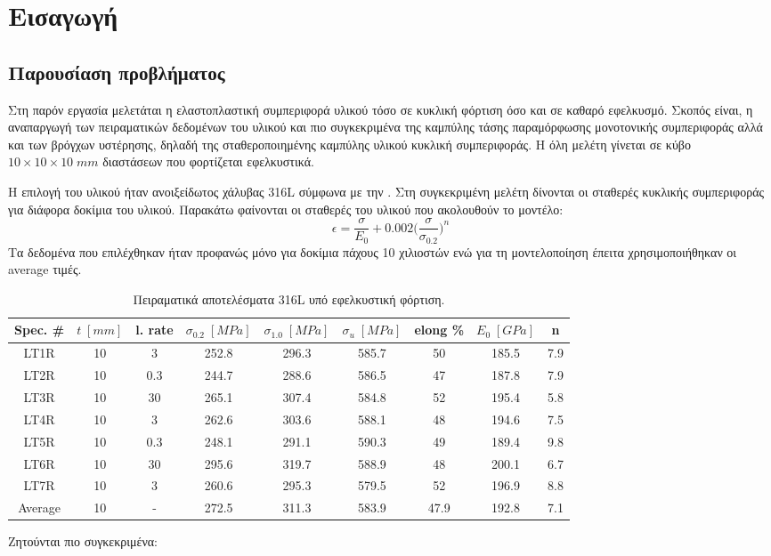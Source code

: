 \documentclass{article}
\begin{document}

\tableofcontents

\section{Εισαγωγή}
\subsection{Παρουσίαση προβλήματος}

Στη παρόν εργασία μελετάται η ελαστοπλαστική συμπεριφορά υλικού τόσο σε κυκλική φόρτιση όσο και σε καθαρό εφελκυσμό. Σκοπός είναι, η αναπαργωγή των πειραματικών δεδομένων του υλικού και πιο συγκεκριμένα της καμπύλης τάσης παραμόρφωσης μονοτονικής συμπεριφοράς αλλά και των βρόγχων υστέρησης, δηλαδή της σταθεροποιημένης καμπύλης υλικού κυκλική συμπεριφοράς. Η όλη μελέτη γίνεται σε κύβο $10\times 10\times 10\; mm$ διαστάσεων που φορτίζεται εφελκυστικά. 
\par Η επιλογή του υλικού ήταν ανοιξείδωτος χάλυβας 316L σύμφωνα με την \cite{RASMUSSEN200347}. Στη συγκεκριμένη μελέτη δίνονται οι σταθερές κυκλικής συμπεριφοράς για διάφορα δοκίμια του υλικού. Παρακάτω φαίνονται οι σταθερές του υλικού που ακολουθούν το μοντέλο:
\begin{equation}
    \epsilon = \frac{\sigma}{E_0} + 0.002 \bigg(\frac{\sigma}{\sigma_{0.2}} \bigg)^n
\end{equation}
Τα δεδομένα που επιλέχθηκαν ήταν προφανώς μόνο για δοκίμια πάχους 10 χιλιοστών ενώ για τη μοντελοποίηση έπειτα χρησιμοποιήθηκαν οι average τιμές.
\begin{table}[H]
    \centering
        \begin{tabular}{|c|c|c|c|c|c|c|c|c|}
        \hline
        \rowcolor{Dandelion}
        Spec. \# & $t\; [mm]$ & l. rate & $\sigma_{0.2}\; [MPa]$ & $\sigma_{1.0}\; [MPa]$ & $\sigma_u\; [MPa]$ & elong \% & $E_0 \; [GPa]$ & n\\
        \hline
        LT1R & 10 & 3 & 252.8 & 296.3 & 585.7 & 50 & 185.5 & 7.9 \\
        \hline
        LT2R & 10 & 0.3 & 244.7 & 288.6 & 586.5 & 47 & 187.8 & 7.9 \\
        \hline
        LT3R & 10 & 30 & 265.1 & 307.4 & 584.8 & 52 & 195.4 & 5.8 \\
        \hline
        LT4R & 10 & 3 & 262.6 & 303.6 & 588.1 & 48 & 194.6 & 7.5 \\
        \hline
        LT5R & 10 & 0.3 & 248.1 & 291.1 & 590.3 & 49 & 189.4 & 9.8 \\
        \hline
        LT6R & 10 & 30 & 295.6 & 319.7 & 588.9 & 48 & 200.1 & 6.7 \\
        \hline
        LT7R & 10 & 3 & 260.6 & 295.3 & 579.5 & 52 & 196.9 & 8.8 \\
        \hline
        Average & 10 & - & 272.5 & 311.3 & 583.9 & 47.9 & 192.8 & 7.1 \\
        \hline
        \end{tabular}
    \caption{Πειραματικά αποτελέσματα 316L υπό εφελκυστική φόρτιση.}
    \label{tab:peiram}
\end{table}
Ζητούνται πιο συγκεκριμένα:
\end{document}
